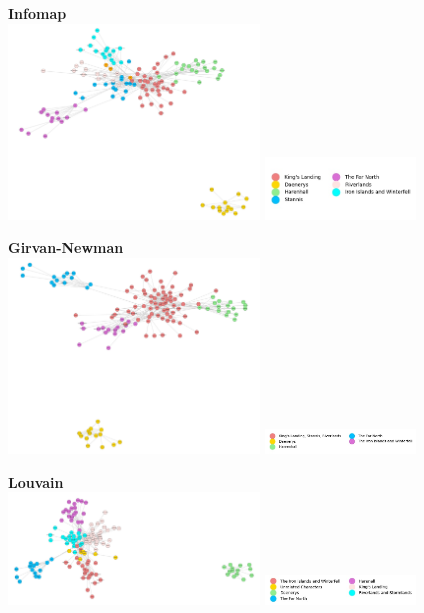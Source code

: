 \documentclass[10pt,twocolumn,letterpaper]{article}
\begin{document}
\begin{center}
    \textbf{Infomap}  \\
    \includegraphics[width=0.5\textwidth]{img/s2/communities_infomap.jpg}
    \includegraphics[width=0.3\textwidth]{img/s2/infomap_legend.jpg}\\
    \caption{\small{$\#communities=8$, $modularity=0.561$}}
\end{center}


\begin{center}
    \textbf{Girvan-Newman} \\
    \includegraphics[width=0.5\textwidth]{img/s2/communities_g-n.jpg}
    \includegraphics[width=0.3\textwidth]{img/s2/g-n_legend.jpg}\\
    \caption{\small{$\#communities=5$, $modularity=0.477$}}
\end{center}


\begin{center}
    \textbf{Louvain} \\
    \includegraphics[width=0.5\textwidth]{img/s2/communities_louvain.jpg}
    \includegraphics[width=0.3\textwidth]{img/s2/louvain_legend.jpg}\\
    \caption{\small{$\#communities=7$, $modularity=0.563$}}
\end{center}
\end{document}

